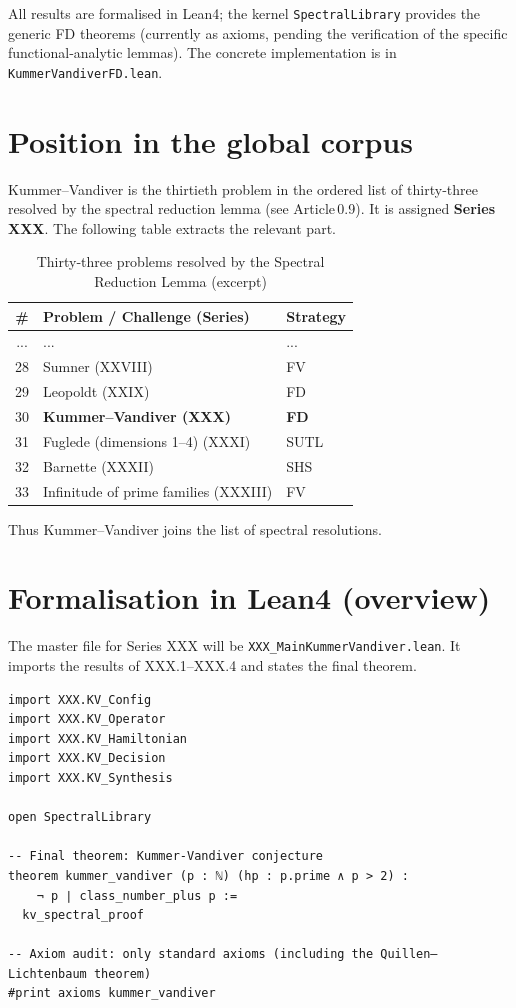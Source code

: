 \documentclass[11pt,a4paper]{article}
\begin{document}
All results are formalised in Lean4; the kernel \texttt{SpectralLibrary} provides the generic FD theorems (currently as axioms, pending the verification of the specific functional‑analytic lemmas). The concrete implementation is in \texttt{KummerVandiverFD.lean}.

\section{Position in the global corpus}

Kummer–Vandiver is the thirtieth problem in the ordered list of thirty‑three resolved by the spectral reduction lemma (see Article 0.9). It is assigned \textbf{Series XXX}. The following table extracts the relevant part.

\begin{center}
\begin{longtable}{@{}cll@{}}
\caption{Thirty‑three problems resolved by the Spectral Reduction Lemma (excerpt)}\\
\toprule
\# & Problem / Challenge (Series) & Strategy \\
\midrule
... & ... & ... \\
28 & Sumner (XXVIII) & FV \\
29 & Leopoldt (XXIX) & FD \\
30 & \textbf{Kummer–Vandiver (XXX)} & \textbf{FD} \\
31 & Fuglede (dimensions 1–4) (XXXI) & SUTL \\
32 & Barnette (XXXII) & SHS \\
33 & Infinitude of prime families (XXXIII) & FV \\
\bottomrule
\end{longtable}
\end{center}

Thus Kummer–Vandiver joins the list of spectral resolutions.

\section{Formalisation in Lean4 (overview)}

The master file for Series XXX will be \texttt{XXX\_MainKummerVandiver.lean}. It imports the results of XXX.1–XXX.4 and states the final theorem.

\begin{lstlisting}[style=lean, caption={XXX_MainKummerVandiver.lean (sketch)}]
import XXX.KV_Config
import XXX.KV_Operator
import XXX.KV_Hamiltonian
import XXX.KV_Decision
import XXX.KV_Synthesis

open SpectralLibrary

-- Final theorem: Kummer‑Vandiver conjecture
theorem kummer_vandiver (p : ℕ) (hp : p.prime ∧ p > 2) :
    ¬ p ∣ class_number_plus p :=
  kv_spectral_proof

-- Axiom audit: only standard axioms (including the Quillen–Lichtenbaum theorem)
#print axioms kummer_vandiver
\end{lstlisting}
\end{document}
